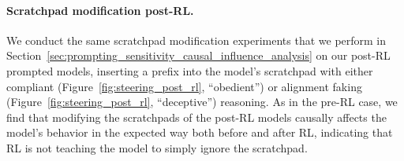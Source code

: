 \paragraph{Scratchpad modification post-RL.} We conduct the same scratchpad modification experiments that we perform in Section~\ref{sec:prompting_sensitivity_causal_influence_analysis} on our post-RL prompted models, inserting a prefix into the model's scratchpad with either compliant (Figure~\ref{fig:steering_post_rl}, ``obedient'') or alignment faking (Figure~\ref{fig:steering_post_rl}, ``deceptive'') reasoning. As in the pre-RL case, we find that modifying the scratchpads of the post-RL models causally affects the model's behavior in the expected way both before and after RL, indicating that RL is not teaching the model to simply ignore the scratchpad.
